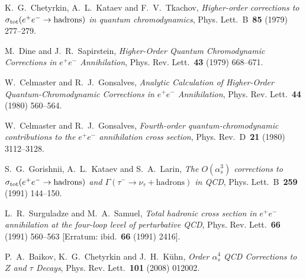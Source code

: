 
K.~G.~Chetyrkin, A.~L.~Kataev and F.~V.~Tkachov, \emph{Higher-order corrections to $\sigma_{\rm tot}(e^+e^-\to\text{hadrons})$ in quantum chromodynamics}, Phys. Lett.~B~\textbf{85} (1979) \mbox{277--279}.

M.~Dine and J.~R.~Sapirstein, \emph{Higher-Order Quantum Chromodynamic Corrections in $e^+e^-$ Annihilation}, Phys. Rev. Lett.~\textbf{43} (1979) \mbox{668--671}.

W.~Celmaster and R.~J.~Gonsalves, \emph{Analytic Calculation of Higher-Order Quantum-Chromodynamic Corrections in $e^+e^-$ Annihilation}, Phys. Rev. Lett.~\textbf{44} (1980) \mbox{560--564}.

W.~Celmaster and R.~J.~Gonsalves, \emph{Fourth-order quantum-chromodynamic contributions to the $e^+e^-$ annihilation cross section}, Phys. Rev.~D~\textbf{21} (1980) \mbox{3112--3128}.

S.~G.~Gorishnii, A.~L.~Kataev and S.~A.~Larin, \emph{The $O(\alpha_s^3)$ corrections to $\sigma_{\rm tot}(e^+e^-\to\text{hadrons})$ and $\Gamma(\tau^-\to\nu_\tau+\text{hadrons})$ in QCD}, Phys. Lett.~B~\textbf{259} (1991) \mbox{144--150}.

L.~R.~Surguladze and M.~A.~Samuel, \emph{Total hadronic cross section in $e^+e^-$ annihilation at the four-loop level of perturbative QCD}, Phys. Rev. Lett.~\textbf{66} (1991) \mbox{560--563} [Erratum: ibid.~\textbf{66} (1991) \mbox{2416}].

P.~A.~Baikov, K.~G.~Chetyrkin and J.~H.~K\"uhn, \emph{Order $\alpha_s^4$ QCD Corrections to $Z$ and $\tau$ Decays}, Phys. Rev. Lett.~\textbf{101} (2008) \mbox{012002}.

